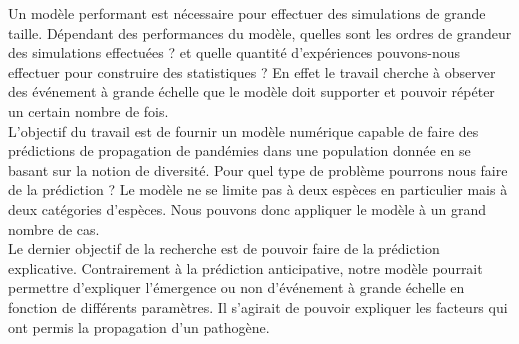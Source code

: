 Un modèle performant est nécessaire pour effectuer des simulations de grande taille. Dépendant des performances du modèle, quelles sont les ordres de grandeur des simulations effectuées ? et quelle quantité d'expériences pouvons-nous effectuer pour construire des statistiques ? En effet le travail cherche à observer des événement à grande échelle que le modèle doit supporter et pouvoir répéter un certain nombre de fois.\\

L'objectif du travail est de fournir un modèle numérique capable de faire des prédictions de propagation de pandémies dans une population donnée en se basant sur la notion de diversité. Pour quel type de problème pourrons nous faire de la prédiction ? Le modèle ne se limite pas à deux espèces en particulier mais à deux catégories d'espèces. Nous pouvons donc appliquer le modèle à un grand nombre de cas.\\

Le dernier objectif de la recherche est de pouvoir faire de la prédiction explicative. Contrairement à la prédiction anticipative, notre modèle pourrait permettre d'expliquer l'émergence ou non d'événement à grande échelle en fonction de différents paramètres. Il s'agirait de pouvoir expliquer les facteurs qui ont permis la propagation d'un pathogène.